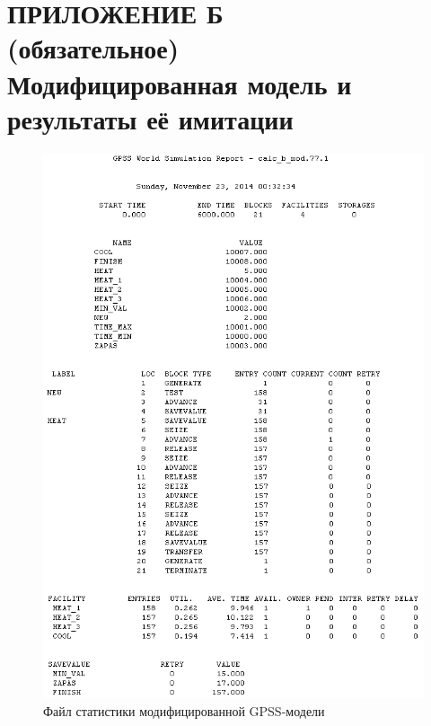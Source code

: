 \section*{ПРИЛОЖЕНИЕ Б \\
  (обязательное) \\ 
  Модифицированная модель и результаты её имитации}
\label{sec:appendix_b}

\pagestyle{fancy}
\fancyhf{}  %
\fancyfoot[R]{\thepage}
\renewcommand{\headrulewidth}{0pt}
\renewcommand{\footrulewidth}{0pt}

\setlength{\headheight}{10mm}
\setlength{\headsep}{\baselineskip}

\thispagestyle{plain}

\setcounter{section}{2}
\setcounter{figure}{0}
\setcounter{table}{0}
\setcounter{lstlisting}{0}



\begin{figure}[h!]
  \centering
  \includegraphics[width=150mm]{pic/modified_report}
  \caption{Файл статистики модифицированной GPSS-модели}
  \label{pic:modified_report}
\end{figure}

